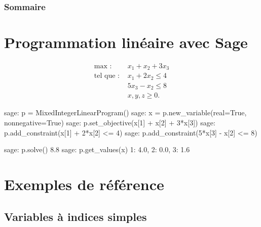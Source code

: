 \documentclass[french]{beamer}
\begin{document}
\begin{frame}
 \frametitle{Sommaire}
{\scriptsize
\begin{multicols}{2} 
 \tableofcontents
\end{multicols}
}

 
 \end{frame}

\normalsize



\section{Programmation linéaire avec Sage}


\begin{frame}
  \begin{align*}
  \text{max : }&x_1+x_2+3x_3\\
  \text{tel que : }&x_1+2x_2 \leqslant 4\\
  &5x_3  - x_2 \leqslant 8 \\
  &x,y,z \geqslant 0.
\end{align*}
\end{frame}

\begin{frame}[fragile]
\begin{pythoncode}
sage: p = MixedIntegerLinearProgram()
sage: x = p.new_variable(real=True, nonnegative=True)
sage: p.set_objective(x[1] + x[2] + 3*x[3])
sage: p.add_constraint(x[1] + 2*x[2] <= 4)
sage: p.add_constraint(5*x[3] - x[2] <= 8)
\end{pythoncode}

\pause
  
\begin{pythoncode}
sage: p.solve()
8.8
sage: p.get_values(x)
{1: 4.0, 2: 0.0, 3: 1.6}
\end{pythoncode}




\end{frame}


\section{Exemples de référence}


\subsection{Variables à indices simples}
\end{document}
